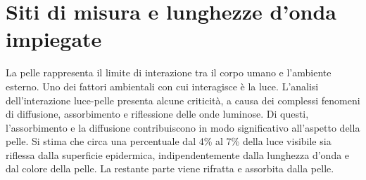 \section{Siti di misura e lunghezze d'onda impiegate}\label{cap:sitimisura}
La pelle rappresenta il limite di interazione tra il corpo umano e l'ambiente esterno. Uno dei fattori ambientali con cui interagisce è la luce. L'analisi dell'interazione luce-pelle presenta alcune criticità, a causa dei complessi fenomeni di diffusione, assorbimento e riflessione  delle onde luminose. Di questi, l'assorbimento e la diffusione contribuiscono in modo significativo all'aspetto della pelle. Si stima che circa una percentuale dal 4\% al 7\% della luce visibile sia riflessa dalla superficie epidermica, indipendentemente dalla lunghezza d'onda e dal colore della pelle. La restante parte viene rifratta e assorbita dalla pelle. 
\pagebreak
